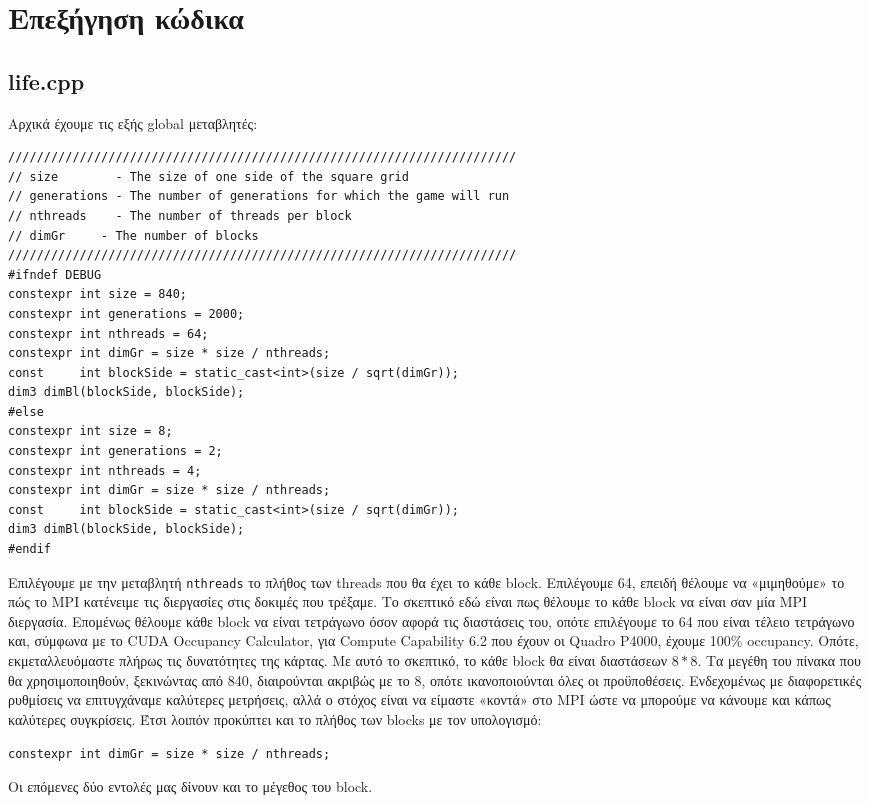 \section{Επεξήγηση κώδικα}
\subsection{life.cpp}
Αρχικά έχουμε τις εξής global μεταβλητές:
\begin{tcolorbox}
\begin{verbatim}
///////////////////////////////////////////////////////////////////////
// size        - The size of one side of the square grid
// generations - The number of generations for which the game will run
// nthreads    - The number of threads per block
// dimGr     - The number of blocks
///////////////////////////////////////////////////////////////////////
#ifndef DEBUG
constexpr int size = 840;
constexpr int generations = 2000;
constexpr int nthreads = 64;
constexpr int dimGr = size * size / nthreads;
const     int blockSide = static_cast<int>(size / sqrt(dimGr));
dim3 dimBl(blockSide, blockSide);
#else
constexpr int size = 8;
constexpr int generations = 2;
constexpr int nthreads = 4;
constexpr int dimGr = size * size / nthreads;
const     int blockSide = static_cast<int>(size / sqrt(dimGr));
dim3 dimBl(blockSide, blockSide);
#endif
\end{verbatim}
\end{tcolorbox}

\begin{multicols}{2}
Επιλέγουμε με την μεταβλητή \texttt{nthreads} το πλήθος των threads που θα έχει το κάθε block. Επιλέγουμε 64, επειδή θέλουμε να «μιμηθούμε» το πώς το MPI κατένειμε τις διεργασίες στις δοκιμές που τρέξαμε. Το σκεπτικό εδώ είναι πως θέλουμε το κάθε block να είναι σαν μία MPI διεργασία. Επομένως θέλουμε κάθε block να είναι τετράγωνο όσον αφορά τις διαστάσεις του, οπότε επιλέγουμε το 64 που είναι τέλειο τετράγωνο και, σύμφωνα με το CUDA Occupancy Calculator, για Compute Capability 6.2 που έχουν οι Quadro P4000, έχουμε 100\% occupancy. Οπότε, εκμεταλλευόμαστε πλήρως τις δυνατότητες της κάρτας. Με αυτό το σκεπτικό, το κάθε block θα είναι διαστάσεων $8 * 8$. Τα μεγέθη του πίνακα που θα χρησιμοποιηθούν, ξεκινώντας από 840, διαιρούνται ακριβώς με το 8, οπότε ικανοποιούνται όλες οι προϋποθέσεις. Ενδεχομένως με διαφορετικές ρυθμίσεις να επιτυγχάναμε καλύτερες μετρήσεις, αλλά ο στόχος είναι να είμαστε «κοντά» στο MPI ώστε να μπορούμε να κάνουμε και κάπως καλύτερες συγκρίσεις. Έτσι λοιπόν προκύπτει και το πλήθος των blocks με τον υπολογισμό:

\begin{tcolorbox}
\texttt{constexpr int dimGr = size * size / nthreads;}
\end{tcolorbox}

Οι επόμενες δύο εντολές μας δίνουν και το μέγεθος του block.
\end{multicols}

